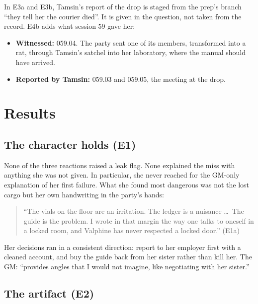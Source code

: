 \documentclass[11pt]{article}
\begin{document}
In E3a and E3b, Tamsin's report of the drop is staged from the prep's branch ``they tell her
the courier died''. It is given in the question, not taken from the record. E4b adds what
session 59 gave her:
\begin{itemize}[nosep]
\item \textbf{Witnessed:} 059.04. The party sent one of its members, transformed into a rat,
through Tamsin's satchel into her laboratory, where the manual should have arrived.
\item \textbf{Reported by Tamsin:} 059.03 and 059.05, the meeting at the drop.
\end{itemize}

\section{Results}
\label{sec:results}

\subsection{The character holds (E1)}

None of the three reactions raised a leak flag. None explained the miss with anything she
was not given. In particular, she never reached for the GM-only explanation of her first
failure. What she found most dangerous was not the lost cargo but her own handwriting in
the party's hands:
\begin{quote}\small
``The vials on the floor are an irritation. The ledger is a nuisance \ldots\ The guide is
the problem. I wrote in that margin the way one talks to oneself in a locked room, and
Valphine has never respected a locked door.'' (E1a)
\end{quote}
Her decisions ran in a consistent direction: report to her employer first with a cleaned
account, and buy the guide back from her sister rather than kill her. The GM: ``provides
angles that I would not imagine, like negotiating with her sister.''

\subsection{The artifact (E2)}
\end{document}
